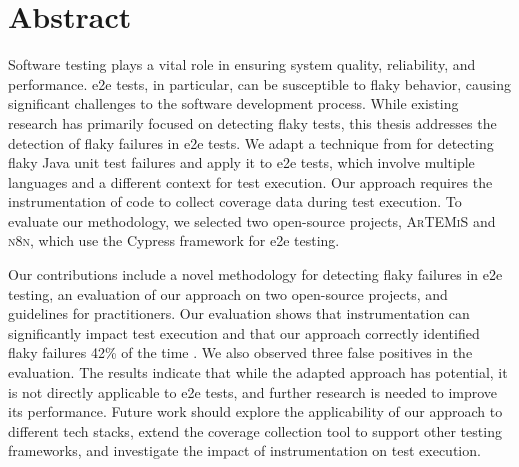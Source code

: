 \chapter{Abstract}

Software testing plays a vital role in ensuring system quality, reliability, and performance. 
\acf*{e2e} tests, in particular, can be susceptible to flaky behavior, causing significant challenges to the software development process. 
While existing research has primarily focused on detecting flaky tests, this thesis addresses the detection of flaky failures in \ac*{e2e} tests. 
We adapt a technique from \citeauthor*{bell_deflaker_2018} for detecting flaky Java unit test failures and apply it to \ac*{e2e} tests, which involve multiple languages and a different context for test execution. Our approach requires the instrumentation of code to collect coverage data during test execution. 
To evaluate our methodology, we selected two open-source projects, \textsc{ArTEMiS} and \textsc{n8n}, which use the Cypress framework for \ac*{e2e} testing.

Our contributions include a novel methodology for detecting flaky failures in \ac*{e2e} testing, an evaluation of our approach on two open-source projects, and guidelines for practitioners. 
Our evaluation shows that instrumentation can significantly impact test execution and that our approach correctly identified flaky failures 42\% of the time . 
We also observed three false positives in the evaluation. 
The results indicate that while the adapted approach has potential, it is not directly applicable to \ac*{e2e} tests, and further research is needed to improve its performance. 
Future work should explore the applicability of our approach to different tech stacks, extend the coverage collection tool to support other testing frameworks, and investigate the impact of instrumentation on test execution.